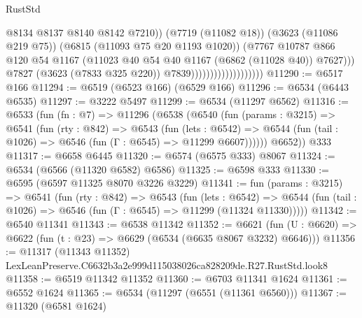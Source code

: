 \begin{lexlean}{RustStd}
\begin{coremodule}
                                                @8134
                                                @8137
                                                @8140
                                                @8142
                                                @7210))
                                            (@7719 (@11082 @18))
                                            (@3623 (@11086 @219 @75))
                                            (@6815 (@11093 @75 @20 @1193 @1020))
                                            (@7767
                                              @10787
                                              @866
                                              @120
                                              @54
                                              @1167
                                              (@11023
                                                @40
                                                @54
                                                @40
                                                @1167
                                                (@6862 (@11028 @40))
                                                @7627)))
                                          @7827
                                          (@3623 (@7833 @325 @220))
                                          @7839)))))))))))))))))))
@11290 := @6517 @166
@11294 := @6519 (@6523 @166) (@6529 @166)
@11296 := @6534 (@6443 @6535)
@11297 := @3222 @5497
@11299 := @6534 (@11297 @6562)
@11316 := @6533
    (fun (fn : @7) =>
    @11296
      (@6538
        (@6540
          (fun (params : @3215) =>
          @6541
            (fun (rty : @842) =>
            @6543
              (fun (lets : @6542) =>
              @6544 (fun (tail : @1026) => @6546 (fun (Γ : @6545) => @11299 @6607))))))
        @6652))
    @333
@11317 := @6658 @6445
@11320 := @6574 (@6575 @333) @8067
@11324 := @6534 (@6566 (@11320 @6582) @6586)
@11325 := @6598 @333
@11330 := @6595 (@6597 @11325 @8070 @3226 @3229)
@11341 := fun (params : @3215) =>
  @6541
    (fun (rty : @842) =>
    @6543
      (fun (lets : @6542) =>
      @6544 (fun (tail : @1026) => @6546 (fun (Γ : @6545) => @11299 (@11324 @11330)))))
@11342 := @6540 @11341
@11343 := @6538 @11342
@11352 := @6621
    (fun (U : @6620) => @6622 (fun (t : @23) => @6629 (@6534 (@6635 @8067 @3232) @6646)))
@11356 := @11317 (@11343 @11352) LexLeanPreserve.C6632b3a2e999d115038026ca828209de.R27.RustStd.look8
@11358 := @6519 @11342 @11352
@11360 := @6703 @11341 @1624
@11361 := @6552 @1624
@11365 := @6534 (@11297 (@6551 (@11361 @6560)))
@11367 := @11320 (@6581 @1624)

\end{coremodule}
\end{lexlean}
